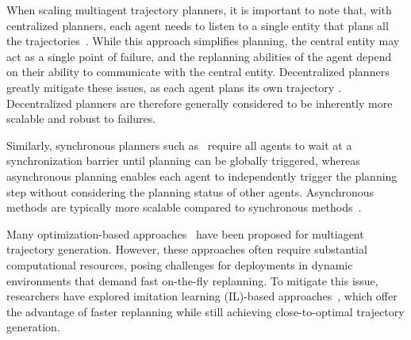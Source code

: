 When scaling multiagent trajectory planners, it is important to note that, with centralized planners, each agent needs to listen to a single entity that plans all the trajectories~\cite{robinson2018efficient, park2020efficient}. While this approach simplifies planning, the central entity may act as a single point of failure, and the replanning abilities of the agent depend on their ability to communicate with the central entity. Decentralized planners greatly mitigate these issues, as each agent plans its own trajectory \cite{zhou2020ego-swarm, tordesillas2020mader, sebetghadam2022distributed, kondo2023robust, toumieh2023decentralized, batra2022decentralized}. Decentralized planners are therefore generally considered to be inherently more scalable and robust to failures.

Similarly, synchronous planners such as~\cite{van2017distributed, sebetghadam2022distributed, firoozi2020distributed} require all agents to wait at a synchronization barrier until planning can be globally triggered, whereas asynchronous planning enables each agent to independently trigger the planning step without considering the planning status of other agents. Asynchronous methods are typically more scalable compared to synchronous methods~\cite{zhou2020ego-swarm, kondo2023robust, tordesillas2020mader}.

Many optimization-based approaches~\cite{tordesillas2020mader, kondo2023robust, toumieh2023decentralized, zhou2020ego-swarm} have been proposed for multiagent trajectory generation. However, these approaches often require substantial computational resources, posing challenges for deployments in dynamic environments that demand fast on-the-fly replanning. To mitigate this issue, researchers have explored imitation learning (IL)-based approaches~\cite{tordesillas2023deep, Tagliabue2021DemonstrationEfficientGP, Park2020VisionBasedOA}, which offer the advantage of faster replanning while still achieving close-to-optimal trajectory generation.


